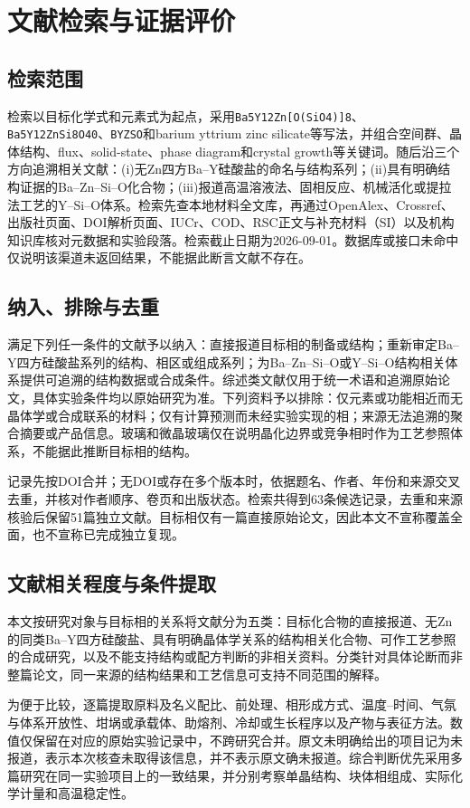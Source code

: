 \section{文献检索与证据评价}
\label{sec:review-method}

\subsection{检索范围}

检索以目标化学式和元素式为起点，采用\texttt{Ba5Y12Zn[O(SiO4)]8}、\texttt{Ba5Y12ZnSi8O40}、\texttt{BYZSO}和barium yttrium zinc silicate等写法，并组合空间群、晶体结构、flux、solid-state、phase diagram和crystal growth等关键词。随后沿三个方向追溯相关文献：(i)无Zn四方Ba--Y硅酸盐的命名与结构系列；(ii)具有明确结构证据的Ba--Zn--Si--O化合物；(iii)报道高温溶液法、固相反应、机械活化或提拉法工艺的Y--Si--O体系。检索先查本地材料全文库，再通过OpenAlex、Crossref、出版社页面、DOI解析页面、IUCr、COD、RSC正文与补充材料（SI）以及机构知识库核对元数据和实验段落。检索截止日期为2026-09-01。数据库或接口未命中仅说明该渠道未返回结果，不能据此断言文献不存在。

\subsection{纳入、排除与去重}

满足下列任一条件的文献予以纳入：直接报道目标相的制备或结构；重新审定Ba--Y四方硅酸盐系列的结构、相区或组成系列；为Ba--Zn--Si--O或Y--Si--O结构相关体系提供可追溯的结构数据或合成条件。综述类文献仅用于统一术语和追溯原始论文，具体实验条件均以原始研究为准。下列资料予以排除：仅元素或功能相近而无晶体学或合成联系的材料；仅有计算预测而未经实验实现的相；来源无法追溯的聚合摘要或产品信息。玻璃和微晶玻璃仅在说明晶化边界或竞争相时作为工艺参照体系，不能据此推断目标相的结构。

记录先按DOI合并；无DOI或存在多个版本时，依据题名、作者、年份和来源交叉去重，并核对作者顺序、卷页和出版状态。检索共得到63条候选记录，去重和来源核验后保留51篇独立文献。目标相仅有一篇直接原始论文，因此本文不宣称覆盖全面，也不宣称已完成独立复现。

\subsection{文献相关程度与条件提取}

本文按研究对象与目标相的关系将文献分为五类：目标化合物的直接报道、无Zn的同类Ba--Y四方硅酸盐、具有明确晶体学关系的结构相关化合物、可作工艺参照的合成研究，以及不能支持结构或配方判断的非相关资料。分类针对具体论断而非整篇论文，同一来源的结构结果和工艺信息可支持不同范围的解释。

为便于比较，逐篇提取原料及名义配比、前处理、相形成方式、温度--时间、气氛与体系开放性、坩埚或承载体、助熔剂、冷却或生长程序以及产物与表征方法。数值仅保留在对应的原始实验记录中，不跨研究合并。原文未明确给出的项目记为未报道，表示本次核查未取得该信息，并不表示原文确未报道。综合判断优先采用多篇研究在同一实验项目上的一致结果，并分别考察单晶结构、块体相组成、实际化学计量和高温稳定性。
